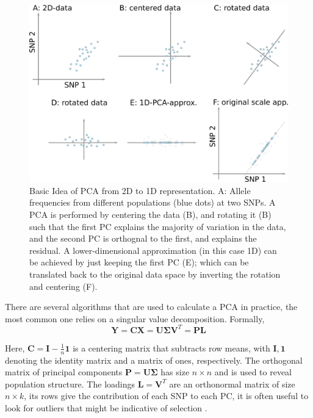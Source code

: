\documentclass[10pt,a4paper]{article}
\newcommand{\MX}{\mathbf{X}} %
\newcommand{\MC}{\mathbf{C}} %
\newcommand{\MY}{\mathbf{Y}} %
\newcommand{\MP}{\mathbf{P}} %
\newcommand{\ML}{\mathbf{L}} %
\newcommand{\MSINGULAR}{\mathbf{\Sigma}} %
\begin{document}
	\begin{figure}
		\includegraphics[width=\textwidth]{pca_explanation.png}
		\caption{Basic Idea of PCA from 2D to 1D representation. A: Allele frequencies from different populations (blue dots) at two SNPs. A PCA is performed by centering the data (B), and rotating it (B) such that the first PC explains the majority of variation in the data, and the second PC is orthognal to the first, and explains the residual. A lower-dimensional approximation (in this case 1D) can be achieved by just keeping the first PC (E); which can be translated back to the original data space by inverting the rotation and centering (F).}
		\label{fig:pca_explanation}
	\end{figure}
	
	There are several algorithms that are used to calculate a PCA in practice, the most common one relies on a singular value decomposition. Formally, 
	\begin{equation}
	\MY = \MC\MX = \mathbf{U} \MSINGULAR \mathbf{V}^T = \MP\ML
	\end{equation}
	
	Here, $\MC = \mathbf{I} -\frac{1}{n}\mathbf{1}$ is a centering matrix that subtracts row means, with $\mathbf{I}, \mathbf{1}$ denoting the identity matrix and a matrix of ones, respectively. The orthogonal matrix of principal components $\MP=\mathbf{U}\MSINGULAR$ has size $n \times n$ and is used to reveal population structure. The loadings $\ML=\mathbf{V}^T$ are an orthonormal matrix of size $n \times k$, its rows give the contribution of each SNP to each PC, it is often useful to look for outliers that might be indicative of selection \cite[e.g]{francois2010}.
	
\end{document}
